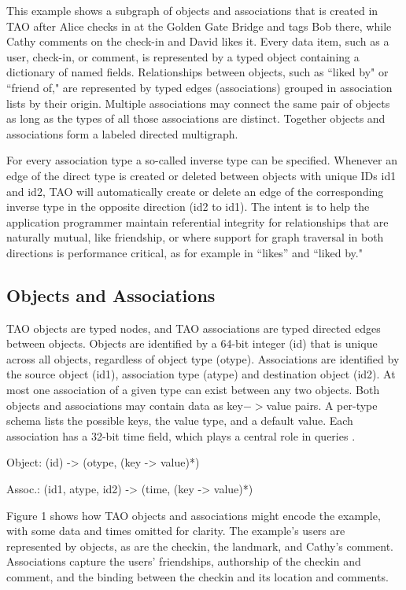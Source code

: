 \documentclass[9pt,twocolumn,twoside]{../../styles/osajnl}
\begin{document}
This example shows a subgraph of objects and associations that is created in TAO after Alice checks in at the Golden Gate Bridge and tags Bob there, while Cathy comments on the check-in and David likes it. Every data item, such as a user, check-in, or comment, is represented by a typed object containing a dictionary of named fields. Relationships between objects, such as “liked by" or “friend of," are represented by typed edges (associations) grouped in association lists by their origin. Multiple associations may connect the same pair of objects as long as the types of all those associations are distinct. Together objects and associations form a labeled directed multigraph.

For every association type a so-called inverse type can be specified. Whenever an edge of the direct type is created or deleted between objects with unique IDs id1 and id2, TAO will automatically create or delete an edge of the corresponding inverse type in the opposite direction (id2 to id1). The intent is to help the application programmer maintain referential integrity for relationships that are naturally mutual, like friendship, or where support for graph traversal in both directions is performance critical, as for example in “likes” and “liked by."

\subsection{Objects and Associations}
TAO objects are typed nodes, and TAO associations are typed directed edges between objects. Objects are identified by a 64-bit integer (id) that is unique across all objects, regardless of object type (otype). Associations are identified by the source object (id1), association type (atype) and destination object (id2). At most one association of a given type can exist between any two objects. Both objects and associations may contain data as key$->$value pairs. A per-type schema lists the possible keys, the value type, and a default value. Each association has a 32-bit time field, which plays a central
role in queries \cite{book-tao1}.


Object: (id) -> (otype, (key -> value)*)

Assoc.: (id1, atype, id2) -> (time, (key -> value)*)


Figure 1 shows how TAO objects and associations might encode the example, with some data and times omitted for clarity. The example’s users are represented by objects, as are the checkin, the landmark, and Cathy’s comment. Associations capture the users’ friendships, authorship of the checkin and comment, and the binding between the checkin and its location and comments.
\end{document}
